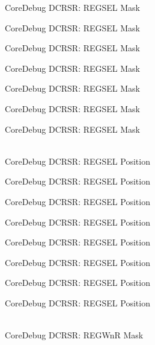 \begin{DoxyRefList}
\label{deprecated__deprecated000132}%
%
Core\+Debug DCRSR:\+ REGSEL Mask 

\label{deprecated__deprecated000188}%
%
Core\+Debug DCRSR:\+ REGSEL Mask 

\label{deprecated__deprecated000271}%
%
Core\+Debug DCRSR:\+ REGSEL Mask 

\label{deprecated__deprecated000330}%
%
Core\+Debug DCRSR:\+ REGSEL Mask 

\label{deprecated__deprecated000406}%
%
Core\+Debug DCRSR:\+ REGSEL Mask 

\label{deprecated__deprecated000495}%
%
Core\+Debug DCRSR:\+ REGSEL Mask 

\label{deprecated__deprecated000597}%
%
Core\+Debug DCRSR:\+ REGSEL Mask  
\item[{\parbox[t]{\linewidth}{Global \doxylink{group__CMSIS__CoreDebug_ga52182c8a9f63a52470244c0bc2064f7b}{Core\+Debug\+\_\+\+DCRSR\+\_\+\+REGSEL\+\_\+\+Pos} }}]\hfill \\
\label{deprecated__deprecated000043}%
%
Core\+Debug DCRSR:\+ REGSEL Position 

\label{deprecated__deprecated000131}%
%
Core\+Debug DCRSR:\+ REGSEL Position 

\label{deprecated__deprecated000187}%
%
Core\+Debug DCRSR:\+ REGSEL Position 

\label{deprecated__deprecated000270}%
%
Core\+Debug DCRSR:\+ REGSEL Position 

\label{deprecated__deprecated000329}%
%
Core\+Debug DCRSR:\+ REGSEL Position 

\label{deprecated__deprecated000405}%
%
Core\+Debug DCRSR:\+ REGSEL Position 

\label{deprecated__deprecated000494}%
%
Core\+Debug DCRSR:\+ REGSEL Position 

\label{deprecated__deprecated000596}%
%
Core\+Debug DCRSR:\+ REGSEL Position  
\item[{\parbox[t]{\linewidth}{Global \doxylink{group__CMSIS__CoreDebug_ga1eef4992d8f84bc6c0dffed1c87f90a5}{Core\+Debug\+\_\+\+DCRSR\+\_\+\+REGWn\+R\+\_\+\+Msk} }}]\hfill \\
\label{deprecated__deprecated000042}%
%
Core\+Debug DCRSR:\+ REGWnR Mask 


\end{DoxyRefList}
